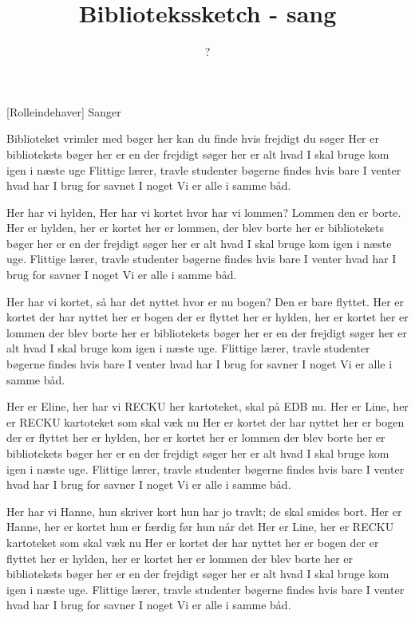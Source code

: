 \documentclass[a4paper,11pt]{article}
\title{Bibliotekssketch - sang}
\author{?}
\begin{document}
\maketitle

\begin{roles}
  [Rolleindehaver] Sanger
\end{roles}

\begin{song}
  Biblioteket vrimler med bøger
  her kan du finde hvis frejdigt du søger
  Her er bibliotekets bøger
  her er en der frejdigt søger
  her er alt hvad I skal bruge
  kom igen i næste uge
  Flittige lærer, travle studenter
  bøgerne findes hvis bare I venter
  hvad har I brug for
  savnet I noget
  Vi er alle i samme båd.

  Her har vi hylden, Her har vi kortet
  hvor har vi lommen?  Lommen den er borte.
  Her er hylden, her er kortet
  her er lommen, der blev borte
  her er bibliotekets bøger
  her er en der frejdigt søger
  her er alt hvad I skal bruge
  kom igen i næste uge.
  Flittige lærer, travle studenter
  bøgerne findes hvis bare I venter
  hvad har I brug for
  savner I noget
  Vi er alle i samme båd.

  Her har vi kortet, så har det nyttet
  hvor er nu bogen? Den er bare flyttet.
  Her er kortet der har nyttet
  her er bogen der er flyttet
  her er hylden, her er kortet
  her er lommen der blev borte
  her er bibliotekets bøger
  her er en der frejdigt søger
  her er alt hvad I skal bruge
  kom igen i næste uge.
  Flittige lærer, travle studenter
  bøgerne findes hvis bare I venter
  hvad har I brug for
  savner I noget
  Vi er alle i samme båd.

  Her er Eline, her har vi RECKU
  her kartoteket, skal på EDB nu.
  Her er Line, her er RECKU
  kartoteket som skal væk nu
  Her er kortet der har nyttet
  her er bogen der er flyttet
  her er hylden, her er kortet
  her er lommen der blev borte
  her er bibliotekets bøger
  her er en der frejdigt søger
  her er alt hvad I skal bruge
  kom igen i næste uge.
  Flittige lærer, travle studenter
  bøgerne findes hvis bare I venter
  hvad har I brug for
  savner I noget
  Vi er alle i samme båd.

  Her har vi Hanne, hun skriver kort
  hun har jo travlt; de skal smides bort.
  Her er Hanne, her er kortet
  hun er færdig før hun når det
  Her er Line, her er RECKU
  kartoteket som skal væk nu
  Her er kortet der har nyttet
  her er bogen der er flyttet
  her er hylden, her er kortet
  her er lommen der blev borte
  her er bibliotekets bøger
  her er en der frejdigt søger
  her er alt hvad I skal bruge
  kom igen i næste uge.
  Flittige lærer, travle studenter
  bøgerne findes hvis bare I venter
  hvad har I brug for
  savner I noget
  Vi er alle i samme båd.


\end{song}
\end{document}
